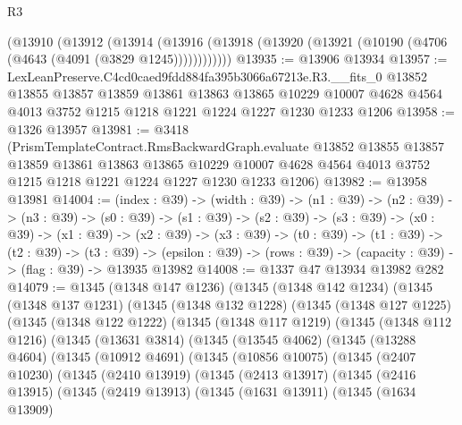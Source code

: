 \begin{lexlean}{R3}
\begin{coremodule}
    (@13910
      (@13912
        (@13914
          (@13916 (@13918 (@13920 (@13921 (@10190 (@4706 (@4643 (@4091 (@3829 @1245))))))))))))
@13935 := @13906 @13934
@13957 := LexLeanPreserve.C4cd0caed9fdd884fa395b3066a67213e.R3.__fits_0
    @13852
    @13855
    @13857
    @13859
    @13861
    @13863
    @13865
    @10229
    @10007
    @4628
    @4564
    @4013
    @3752
    @1215
    @1218
    @1221
    @1224
    @1227
    @1230
    @1233
    @1206
@13958 := @1326 @13957
@13981 := @3418
    (PrismTemplateContract.RmsBackwardGraph.evaluate
      @13852
      @13855
      @13857
      @13859
      @13861
      @13863
      @13865
      @10229
      @10007
      @4628
      @4564
      @4013
      @3752
      @1215
      @1218
      @1221
      @1224
      @1227
      @1230
      @1233
      @1206)
@13982 := @13958 @13981
@14004 := (index : @39) ->
  (width : @39) ->
  (n1 : @39) ->
  (n2 : @39) ->
  (n3 : @39) ->
  (s0 : @39) ->
  (s1 : @39) ->
  (s2 : @39) ->
  (s3 : @39) ->
  (x0 : @39) ->
  (x1 : @39) ->
  (x2 : @39) ->
  (x3 : @39) ->
  (t0 : @39) ->
  (t1 : @39) ->
  (t2 : @39) ->
  (t3 : @39) -> (epsilon : @39) -> (rows : @39) -> (capacity : @39) -> (flag : @39) -> @13935 @13982
@14008 := @1337 @47 @13934 @13982 @282
@14079 := @1345
    (@1348 @147 @1236)
    (@1345
      (@1348 @142 @1234)
      (@1345
        (@1348 @137 @1231)
        (@1345
          (@1348 @132 @1228)
          (@1345
            (@1348 @127 @1225)
            (@1345
              (@1348 @122 @1222)
              (@1345
                (@1348 @117 @1219)
                (@1345
                  (@1348 @112 @1216)
                  (@1345
                    (@13631 @3814)
                    (@1345
                      (@13545 @4062)
                      (@1345
                        (@13288 @4604)
                        (@1345
                          (@10912 @4691)
                          (@1345
                            (@10856 @10075)
                            (@1345
                              (@2407 @10230)
                              (@1345
                                (@2410 @13919)
                                (@1345
                                  (@2413 @13917)
                                  (@1345
                                    (@2416 @13915)
                                    (@1345
                                      (@2419 @13913)
                                      (@1345
                                        (@1631 @13911)
                                        (@1345
                                          (@1634 @13909)

\end{coremodule}
\end{lexlean}

